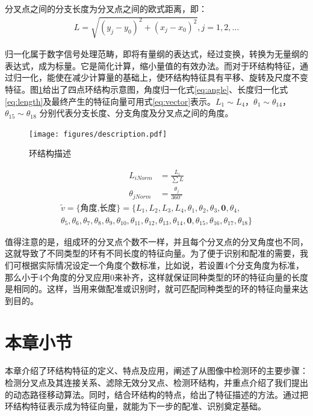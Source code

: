 分叉点之间的分支长度为分叉点之间的欧式距离，即：
\begin{align}
L = \sqrt{(y_j - y_0)^2 + (x_j - x_0)^2}, j = 1, 2, \ldots
\end{align}

归一化属于数字信号处理范畴，即将有量纲的表达式，经过变换，转换为无量纲的表达式，成为标量。它是简化计算，缩小量值的有效办法。而对于环结构特征，通过归一化，能使在减少计算量的基础上，使环结构特征具有平移、旋转及尺度不变特征。图\ref{fig:description}给出了四点环结构示意图，角度归一化式\ref{eq:angle}、长度归一化式\ref{eq:length}及最终产生的特征向量可用式\ref{eq:vector}表示。$L_{1} \sim L_{4}$，$\theta_{1} \sim \theta_{14}$，$\theta_{15} \sim \theta_{18}$ 分别代表分支长度、分支角度及分叉点之间的角度。

\begin{figure}[!ht]
\centering
\texttt{[image: figures/description.pdf]}
\caption{环结构描述}
\label{fig:description}
\end{figure}
\begin{align}
L_{iNorm}&=\frac{L_i}{\sum{L}}\label{eq:length}\\
\theta_{jNorm}&=\frac{\theta_j}{360^\circ}\label{eq:angle}
\end{align}
\begin{multline}
\tilde{v}=\{\textrm{角度,长度}\}=\{L_{1},L_{2},L_{3},L_{4},\theta_{1},\theta_{2},\theta_{3},\mathbf{0},\theta_{4},\\\theta_{5},\theta_{6},\theta_{7},\theta_{8},\theta_{9},\theta_{10},\theta_{11},\theta_{12},\theta_{13},\theta_{14},\mathbf{0},\theta_{15},\theta_{16},\theta_{17},\theta_{18}\}
\label{eq:vector}
\end{multline}

值得注意的是，组成环的分叉点个数不一样，并且每个分叉点的分叉角度也不同，这就导致了不同类型的环有不同长度的特征向量。为了便于识别和配准的需要，我们可根据实际情况设定一个角度个数标准，比如说，若设置4个分支角度为标准，那么小于4个角度的分叉应用0来补齐，这样就保证同种类型的环的特征向量的长度是相同的。这样，当用来做配准或识别时，就可匹配同种类型的环的特征向量来达到目的。

\section{本章小节}
\label{}

本章介绍了环结构特征的定义、特点及应用，阐述了从图像中检测环的主要步骤：检测分叉点及其连接关系、滤除无效分叉点、检测环结构，并重点介绍了我们提出的动态路径移动算法。同时，结合环结构的特点，给出了特征描述的方法。通过把环结构特征表示成为特征向量，就能为下一步的配准、识别奠定基础。
